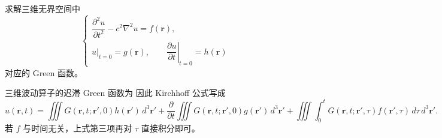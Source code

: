 \begin{question}

求解三维无界空间中
\[
\begin{cases}
\dfrac{\partial^2u}{\partial t^2}-c^2\nabla^2u=f(\mathbf r),\\
u|_{t=0}=g(\mathbf r),\qquad \left.\dfrac{\partial u}{\partial t}\right|_{t=0}=h(\mathbf r)
\end{cases}
\]
对应的 Green 函数。

\begin{solution}

三维波动算子的迟滞 Green 函数为
因此 Kirchhoff 公式写成
\[
 u(\mathbf r,t)=
 \iiint G(\mathbf r,t;\mathbf r',0)h(\mathbf r')\,d^3\mathbf r'
 +\frac{\partial}{\partial t}\iiint G(\mathbf r,t;\mathbf r',0)g(\mathbf r')\,d^3\mathbf r'
 +\iiint\!\int_0^t G(\mathbf r,t;\mathbf r',\tau)f(\mathbf r',\tau)\,d\tau\,d^3\mathbf r'.
\]
若 $f$ 与时间无关，上式第三项再对 $\tau$ 直接积分即可。

\end{solution}
\end{question}

\clearpage

